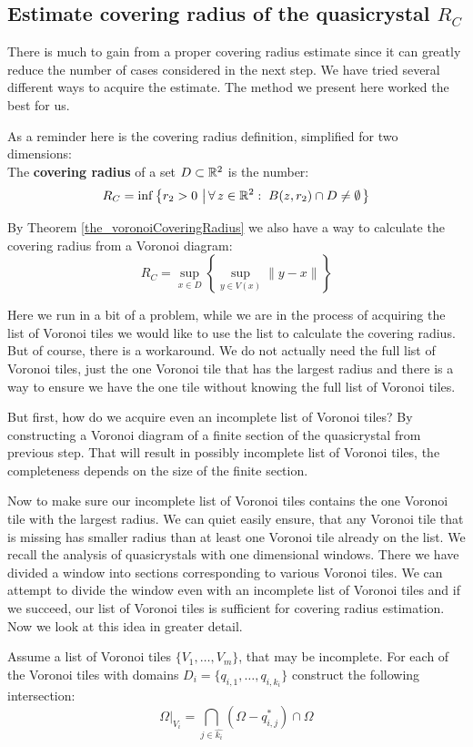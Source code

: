 \documentclass[text.tex]{subfiles}
\begin{document}
\subsection{Estimate covering radius of the quasicrystal $R_C$}
There is much to gain from a proper covering radius estimate since it can greatly reduce the number of cases considered in the next step. We have tried several different ways to acquire the estimate. The method we present here worked the best for us. 

As a reminder here is the covering radius definition, simplified for two dimensions:\\
The \textbf{covering radius} of a set $D\subset \mathbb{R}^2$ is the number: 
$$R_C = \inf\left\{ r_2>0\,\left|\, \forall\, z\in\mathbb{R}^2:\; B(z,r_2)\cap D \neq \emptyset \right. \right\}$$

By Theorem \ref{the_voronoiCoveringRadius} we also have a way to calculate the covering radius from a Voronoi diagram:
$$R_C = \sup_{x\in D}\left\{\sup_{y\in V(x)}\lVert y-x\rVert\right\}$$

Here we run in a bit of a problem, while we are in the process of acquiring the list of Voronoi tiles we would like to use the list to calculate the covering radius. But of course, there is a workaround. We do not actually need the full list of Voronoi tiles, just the one Voronoi tile that has the largest radius and there is a way to ensure we have the one tile without knowing the full list of Voronoi tiles. 

But first, how do we acquire even an incomplete list of Voronoi tiles? By constructing a Voronoi diagram of a finite section of the quasicrystal from previous step. That will result in possibly incomplete list of Voronoi tiles, the completeness depends on the size of the finite section. 

Now to make sure our incomplete list of Voronoi tiles contains the one Voronoi tile with the largest radius. We can quiet easily ensure, that any Voronoi tile that is missing has smaller radius than at least one Voronoi tile already on the list. We recall the analysis of quasicrystals with one dimensional windows. There we have divided a window into sections corresponding to various Voronoi tiles. We can attempt to divide the window even with an incomplete list of Voronoi tiles and if we succeed, our list of Voronoi tiles is sufficient for covering radius estimation. Now we look at this idea in greater detail. 

Assume a list of Voronoi tiles $\{V_1,\dots,V_m\}$, that may be incomplete. For each of the Voronoi tiles with domains $D_i = \{q_{i,1},\dots,q_{i,k_i}\}$ construct the following intersection: 
$$\Omega|_{V_i} = \bigcap\limits_{j\in\hat{k_i}}(\Omega-q_{i,j}^\ast)\cap\Omega$$
\end{document}
